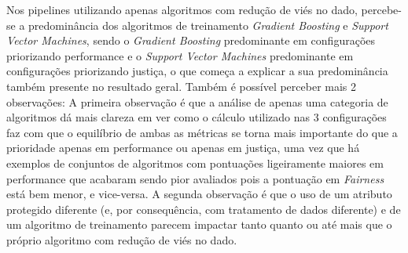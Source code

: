 \documentclass[portugues]{ic-tese}
\begin{document}
Nos pipelines utilizando apenas algoritmos com redução de viés no dado, percebe-se a predominância dos algoritmos de treinamento \textit{Gradient Boosting} e \textit{Support Vector Machines}, sendo o \textit{Gradient Boosting} predominante em configurações priorizando performance e o \textit{Support Vector Machines} predominante em configurações priorizando justiça, o que começa a explicar a sua predominância também presente no resultado geral. Também é possível perceber mais 2 observações: A primeira observação é que a análise de apenas uma categoria de algoritmos dá mais clareza em ver como o cálculo utilizado nas 3 configurações faz com que o equilíbrio de ambas as métricas se torna mais importante do que a prioridade apenas em performance ou apenas em justiça, uma vez que há exemplos de conjuntos de algoritmos com pontuações ligeiramente maiores em performance que acabaram sendo pior avaliados pois a pontuação em \textit{Fairness} está bem menor, e vice-versa. A segunda observação é que o uso de um atributo protegido diferente (e, por consequência, com tratamento de dados diferente) e de um algoritmo de treinamento parecem impactar tanto quanto ou até mais que o próprio algoritmo com redução de viés no dado.

\begin{table}[H]
\begin{center}
  \caption{Melhores opções escolhidas pelo modelo MAPE-K \\ Apenas com redução de viés no treinamento - 50\% Performance/50\% Fairness}
\label{tbl:ScoreMAPEKInproc5050}
\end{center}
\end{table}
\end{document}
